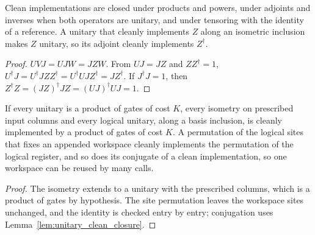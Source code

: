 \begin{lemma}
    \label{lem:unitary_clean_closure}
    \leanok
    Clean implementations are closed under products and powers, under adjoints and inverses
    when both operators are unitary, and under tensoring with the identity of a reference. A
    unitary that cleanly implements $Z$ along an isometric inclusion makes $Z$ unitary, so
    its adjoint cleanly implements $Z^\dagger$.
\end{lemma}
\begin{proof}\leanok
    $UVJ=UJW=JZW$. From $UJ=JZ$ and $ZZ^\dagger=1$, $U^\dagger J=U^\dagger JZZ^\dagger=
        U^\dagger UJZ^\dagger=JZ^\dagger$. If $J^\dagger J=1$, then
    $Z^\dagger Z=(JZ)^\dagger JZ=(UJ)^\dagger UJ=1$.
\end{proof}

\begin{theorem}
    \label{thm:unitary_clean_existence}
    \leanok
    If every unitary is a product of gates of cost $K$, every isometry on prescribed input
    columns and every logical unitary, along a basis inclusion, is cleanly implemented by a
    product of gates of cost $K$. A permutation of the logical sites that fixes an appended
    workspace cleanly implements the permutation of the logical register, and so does its
    conjugate of a clean implementation, so one workspace can be reused by many calls.
\end{theorem}
\begin{proof}\leanok
    The isometry extends to a unitary with the prescribed columns, which is a product of
    gates by hypothesis. The site permutation leaves the workspace sites unchanged, and the
    identity is checked entry by entry; conjugation uses Lemma~\ref{lem:unitary_clean_closure}.
\end{proof}

